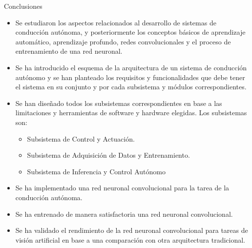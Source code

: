 \documentclass[10pt]{beamer}
\begin{document}
\begin{frame}[allowframebreaks]{Conclusiones}
    \begin{itemize}
        \item \alert{Se estudiaron} los aspectos relacionados al desarrollo de sistemas de conducción autónoma, y posteriormente los conceptos básicos 
        de aprendizaje automático, aprendizaje profundo, redes convolucionales y el proceso de entrenamiento de una red neuronal.
        \item Se ha introducido el \alert{esquema de la arquitectura} de un sistema de conducción autónomo y se han planteado 
        los requisitos y funcionalidades que debe tener el sistema en su conjunto y por cada subsistema y módulos correspondientes.
        \item \alert{Se han diseñado} todos los subsistemas correspondientes en base a las limitaciones y herramientas de software y hardware elegidas. Los subsistemas son:
            \begin{itemize}
                \item Subsistema de Control y Actuación.
                \item Subsistema de Adquisición de Datos y Entrenamiento.
                \item Subsistema de Inferencia y Control Autónomo
            \end{itemize}
            \item \alert{Se ha implementado} una red neuronal convolucional para la tarea de la conducción autónoma.
            \item \alert{Se ha entrenado} de manera satisfactoria una red neuronal convolucional.
            \item \alert{Se ha validado el rendimiento} de la red neuronal convolucional para tareas de visión artificial en base a una comparación con otra arquitectura tradicional.
        
    \end{itemize}
\end{frame}
\end{document}
